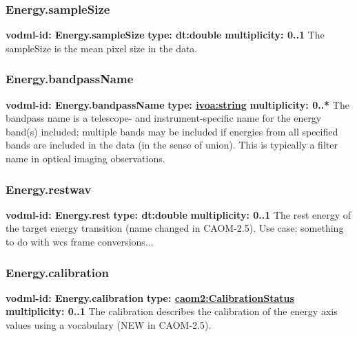     \subsubsection{Energy.sampleSize}
      \textbf{vodml-id: Energy.sampleSize} \newline
      \textbf{type: dt:double} \newline
      \textbf{multiplicity: 0..1} \newline
      The sampleSize is the mean pixel size in the data.

    \subsubsection{Energy.bandpassName}
      \textbf{vodml-id: Energy.bandpassName} \newline
      \textbf{type: \hyperref[sect:ivoa]{ivoa:string}} \newline
      \textbf{multiplicity: 0..*} \newline
      The bandpass name is a telescope- and instrument-specific name for the energy band(s) included; multiple bands may be included if energies from all specified bands are included in the data (in the sense of union). This is typically a filter name in optical imaging observations.

    \subsubsection{Energy.restwav}
      \textbf{vodml-id: Energy.rest} \newline
      \textbf{type: dt:double} \newline
      \textbf{multiplicity: 0..1} \newline
      The rest energy of the target energy transition (name changed in CAOM-2.5). Use case: something to do with wcs frame conversions...

    \subsubsection{Energy.calibration}
      \textbf{vodml-id: Energy.calibration} \newline
      \textbf{type: \hyperref[sect:CalibrationStatus]{caom2:CalibrationStatus}} \newline
      \textbf{multiplicity: 0..1} \newline
      The calibration describes the calibration of the energy axis values using a vocabulary (NEW in CAOM-2.5).

